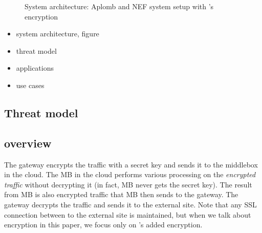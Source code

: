 \begin{figure}[t!]
\centering
{}
%
\vfill  
{}
%
\caption{System architecture: Aplomb and NEF system setup with \sys's encryption \label{fig:sys-overview}}
\end{figure}

\begin{itemize}
\item system architecture, figure
\item threat model
\item applications
\item use cases
\end{itemize}

\subsection{Threat model}




\subsection{\sys overview}

The gateway encrypts
the traffic with a secret key and sends it to the middlebox in the cloud. The MB in the cloud performs various processing 
on the {\em encrypted traffic} without decrypting it (in fact, MB never gets the secret key). The result from MB is also encrypted traffic
that MB then sends to the gateway. The gateway decrypts the traffic and sends it to the external site. 
Note that any SSL connection between to the external site is maintained, but when we talk about encryption in this paper, we focus only
on \sys's added encryption. 



